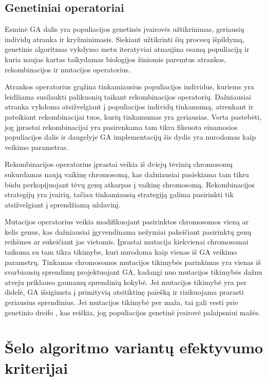 \documentclass{VUMIFInfKursinis}
\begin{document}
\subsection{Genetiniai operatoriai}

Esminė GA dalis yra populiacijos genetinės įvairovės užtikrinimas, geriausių individų atranka ir kryžminimasis.
Siekiant užtikrinti šių procesų išpildymą, genetinis algoritmas vykdymo metu
iteratyviai atnaujina esamą populiaciją ir kuria naujas kartas
taikydamas biologijos žiniomis paremtus atrankos, rekombinacijos ir mutacijos operatorius.

Atrankos operatorius grąžina tinkamiausius populiacijos individus, kuriems yra leidžiama susilaukti palikuonių taikant rekombinacijos operatorių.
Dažniausiai atranka vykdoma atsižvelgiant į populiacijos individų tinkamumą, atrenkant ir pateikiant rekombinacijai tuos, kurių tinkamumas yra geriausias.
Verta pastebėti, jog įprastai rekombinacijai yra pasirenkama tam tikra fiksuota einamosios populiacijos dalis
ir daugelyje GA implementacijų šis dydis yra nurodomas kaip veikimo parametras.

Rekombinacijos operatorius įprastai veikia iš dviejų tėvinių chromosomų sukurdamas naują vaikinę chromosomą, kas dažniausiai pasiekiama
tam tikru būdu perkopijuojant tėvų genų atkarpas į vaikinę chromosomą.
Rekombinacijos strategijų yra įvairių, tačiau tinkamiausią strategiją galima pasirinkti tik atsižvelgiant į sprendžiamą uždavinį.

Mutacijos operatorius veikia modifikuojant pasirinktos chromosomos vieną ar kelis genus,
kas dažniausiai įgyvendinama nežymiai pakeičiant pasirinktų genų reikšmes ar sukeičiant jas vietomis.
Įprastai mutacija kiekvienai chromosomai taikoma su tam tikra tikimybe, kuri nurodoma kaip vienas iš GA veikimo parametrų.
Tinkamas chromosomos mutacijos tikimybės parinkimas yra vienas iš svarbiausių sprendimų projektuojant GA,
kadangi nuo mutacijos tikimybės dažnu atveju priklauso gaunamų sprendinių kokybė.
Jei mutacijos tikimybė yra per didelė, GA išsigimsta į primityvią atsitiktinę paiešką \cite{hassanat2019choosing} ir rizikuojama prarasti geriausius sprendinius.
Jei mutacijos tikimybė per maža, tai gali vesti prie genetinio dreifo \cite{masel2011genetic},
kas reiškia, jog populiacijos genetinė įvairovė palaipsniui mažės.

\section{Šelo algoritmo variantų efektyvumo kriterijai}
\end{document}
